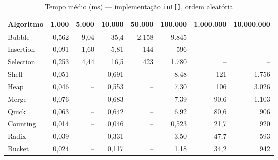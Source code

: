 \begin{table}[htbp]\centering\small
\caption{Tempo médio (ms) — implementação \texttt{int[]}, ordem aleatória}\label{tab:int-aleat}
\setlength{\tabcolsep}{4pt}
\begin{tabular}{lrrrrrrr}
\toprule
Algoritmo & 1.000 & 5.000 & 10.000 & 50.000 & 100.000 & 1.000.000 & 10.000.000 \\
\midrule
Bubble & 0,562 & 9,04 & 35,4 & 2.158 & 9.845 & -- & -- \\
Insertion & 0,091 & 1,60 & 5,81 & 144 & 596 & -- & -- \\
Selection & 0,253 & 4,44 & 16,5 & 423 & 1.780 & -- & -- \\
Shell & 0,051 & -- & 0,691 & -- & 8,48 & 121 & 1.756 \\
Heap & 0,046 & -- & 0,553 & -- & 7,30 & 106 & 3.026 \\
Merge & 0,076 & -- & 0,683 & -- & 7,39 & 90,6 & 1.103 \\
Quick & 0,063 & -- & 0,642 & -- & 6,92 & 80,6 & 906 \\
Counting & 0,014 & -- & 0,046 & -- & 0,523 & 21,7 & 920 \\
Radix & 0,039 & -- & 0,331 & -- & 3,50 & 47,7 & 593 \\
Bucket & 0,024 & -- & 0,117 & -- & 1,18 & 34,2 & 942 \\
\bottomrule
\end{tabular}
\end{table}